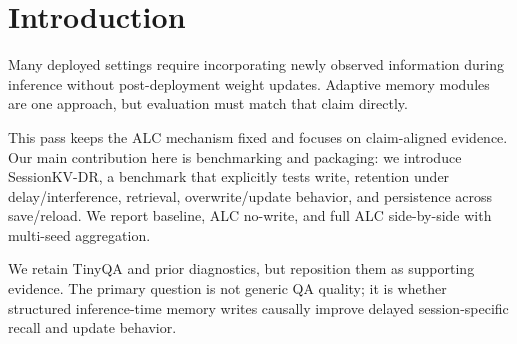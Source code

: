 \section{Introduction}
Many deployed settings require incorporating newly observed information during inference without post-deployment weight updates. Adaptive memory modules are one approach, but evaluation must match that claim directly.

This pass keeps the ALC mechanism fixed and focuses on claim-aligned evidence. Our main contribution here is benchmarking and packaging: we introduce SessionKV-DR, a benchmark that explicitly tests write, retention under delay/interference, retrieval, overwrite/update behavior, and persistence across save/reload. We report baseline, ALC no-write, and full ALC side-by-side with multi-seed aggregation.

We retain TinyQA and prior diagnostics, but reposition them as supporting evidence. The primary question is not generic QA quality; it is whether structured inference-time memory writes causally improve delayed session-specific recall and update behavior.
